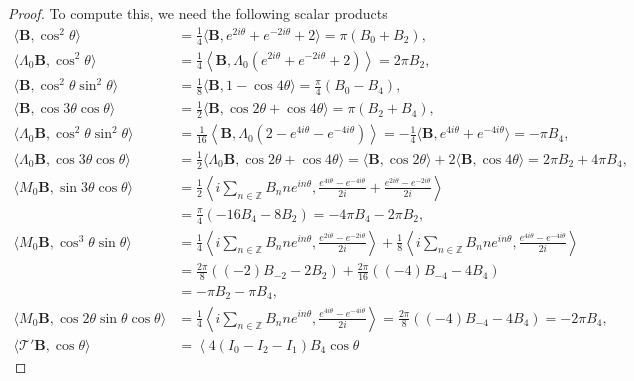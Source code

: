 \documentclass[12pt,reqno]{amsart}
\numberwithin{equation}{section}
\theoremstyle{definition}
\theoremstyle{remark}
\begin{document}
\begin{proof}
To compute this, we need the following scalar products 
\begin{align*}
\langle  \textbf{B}, \cos^2\theta\rangle
&= \frac14 \langle  \textbf{B}, e^{2i\theta} + e^{-2i\theta} + 2 \rangle
= \pi (  B_0 +   B_2) , \\
\langle \Lambda_0 \textbf{B}, \cos^2\theta\rangle
&= \frac14 \left \langle \textbf{B}, \Lambda_0\left ( e^{2i\theta} + e^{-2i\theta} + 2 \right ) \right \rangle
= 2\pi   B_2 , \\
 \langle   \textbf{B}, \cos^2\theta\sin^2\theta\rangle
&=\frac18 \langle \textbf{B}, 1-\cos4\theta\rangle=\frac\pi4(B_0-B_4), \\
 \langle   \textbf{B}, \cos3\theta\cos\theta\rangle
&=\frac12 \langle \textbf{B}, \cos2\theta+\cos4\theta\rangle= \pi(B_2+B_4), \\
\langle \Lambda_0 \textbf{B}, \cos^2\theta\sin^2\theta\rangle
&=\frac1{16} \left \langle\textbf{B}, \Lambda_0\left (2-e^{4i\theta}-e^{-4i\theta}\right )\right \rangle =-\frac1{4} \langle\textbf{B}, e^{4i\theta}+e^{-4i\theta} \rangle  
=-\pi B_4,\\
\langle \Lambda_0 \textbf{B}, \cos3\theta\cos\theta\rangle
&=\frac12\langle \Lambda_0\textbf{B}, \cos2\theta+
	\cos4\theta\rangle =\langle \textbf{B}, \cos2\theta\rangle+2\langle \textbf{B}, \cos4\theta\rangle
=2\pi B_2+4\pi B_4, \\
\langle M_0 \textbf{B}, \sin3\theta\cos\theta\rangle
&=\frac12\left\langle i\sum_{n\in \mathbb{Z}}B_nn e^{in\theta},
\frac{e^{4i\theta}-e^{-4i\theta}}{2i}+\frac{e^{2i\theta}-e^{-2i\theta}}{2i}\right\rangle \\
&=\frac\pi4(-16B_4 -8B_2)=-4\pi B_4-2\pi B_2,\\
\langle M_0 \textbf{B}, \cos^3\theta\sin\theta\rangle
&=\frac14\left\langle i\sum_{n\in\mathbb{Z}} B_nn e^{in\theta},
\frac{e^{2i\theta}-e^{-2i\theta}}{2i}\right\rangle
+\frac18\left\langle i\sum_{n\in\mathbb{Z}} B_nn e^{in\theta},
\frac{e^{4i\theta}-e^{-4i\theta}}{2i}\right\rangle \\
&=\frac {2\pi}8\left ((-2)B_{-2} -2B_2 \right )
+\frac{2\pi}{16}\left ((-4)B_{-4} -4B_4\right ) \\
&=-\pi B_2-\pi B_4, \\
\langle M_0\textbf{B}, \cos2\theta\sin\theta\cos\theta\rangle
&=\frac14\left\langle i\sum_{n\in\mathbb{Z}} B_nn e^{in\theta},
\frac{e^{4i\theta}-e^{-4i\theta}}{2i}\right\rangle= \frac{2\pi}{8}((-4)B_{-4} -4B_4)=-2\pi B_4,\\
\langle \mathcal{T}' \textbf{B}, \cos\theta\rangle
&=\left\langle 4(I_0-I_2-I_1)B_4 \cos\theta

\end{align*}
\end{proof}
\end{document}

